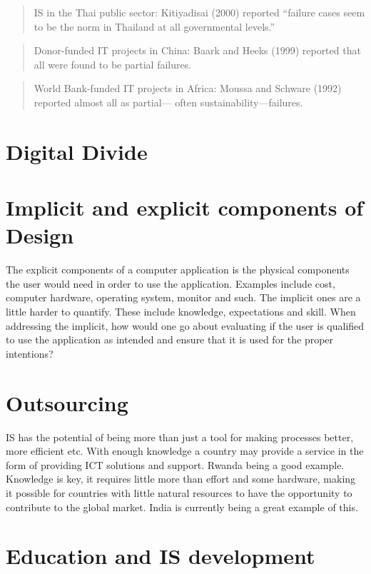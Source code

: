 \begin{quotation}
IS in the Thai public sector: Kitiyadisai (2000)
reported “failure cases seem to be the norm in
Thailand at all governmental levels.”\cite{rh:isdc}
\end{quotation}

\begin{quotation}
Donor-funded IT projects in China: Baark and
Heeks (1999) reported that all were found to be
partial failures.\cite{rh:isdc}
\end{quotation}

\begin{quotation}
World Bank-funded IT projects in Africa: Moussa
and Schware (1992) reported almost all as partial—
often sustainability—failures.\cite{rh:isdc}
\end{quotation}


\section{Digital Divide}

\section{Implicit and explicit components of Design}
The explicit components of a computer application is the physical components the user would need in order to use the application.
Examples include cost, computer hardware, operating system, monitor and such.
The implicit ones are a little harder to quantify. These include knowledge, expectations and skill.
When addressing the implicit, how would one go about evaluating if the user is qualified to use the application as intended and ensure that it is used for the proper intentions?  

\section{Outsourcing}
IS has the potential of being more than just a tool for making processes better, more efficient etc.
With enough knowledge a country may provide a service in the form of providing ICT solutions and support. Rwanda being a good example.
Knowledge is key, it requires little more than effort and some hardware, making it possible for 
countries with little natural resources to have the opportunity to contribute to the global market.
India is currently being a great example of this. 

\section{Education and IS development}

